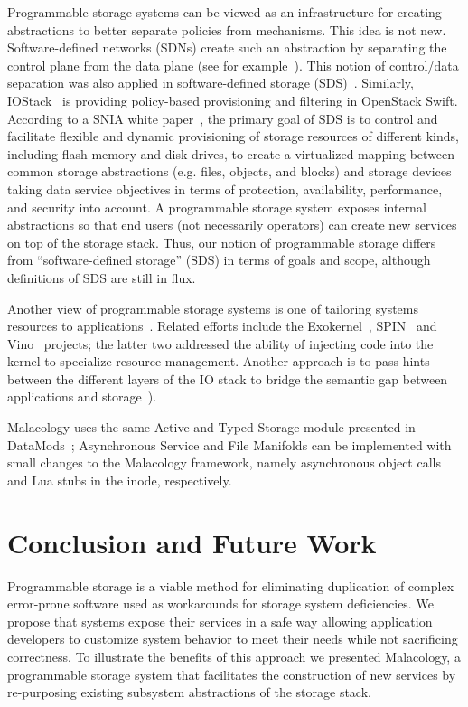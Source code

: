\documentclass[preprint]{sigplanconf-eurosys}
\begin{document}
Programmable storage systems can be viewed as an infrastructure for creating
abstractions to better separate policies from mechanisms. This idea is not new.
Software-defined networks (SDNs) create such an abstraction by separating the
control plane from the data plane (see for example~\cite{jain:sigcomm13}). This
notion of control/data separation was also applied in software-defined storage
(SDS)~\cite{thereska:sosp13,stefanovici:fast16}. Similarly,
IOStack~\cite{gracia:internet16} is providing policy-based provisioning and
filtering in OpenStack Swift. According to a SNIA white
paper~\cite{carlson:snia2014}, the primary goal of SDS is to control and
facilitate flexible and dynamic provisioning of storage resources of different
kinds, including flash memory and disk drives, to create a virtualized mapping
between common storage abstractions (e.g. files, objects, and blocks) and
storage devices taking data service objectives in terms of protection,
availability, performance, and security into account. A programmable storage
system exposes internal abstractions so that end users (not necessarily
operators) can create new services on top of the storage stack. Thus, our
notion of programmable storage differs from ``software-defined storage'' (SDS)
in terms of goals and scope, although definitions of SDS are still in flux.

Another view of programmable storage systems is one of tailoring systems
resources to applications~\cite{arpaci:sosp01}. Related efforts include the
Exokernel~\cite{engler:sosp95}, SPIN~\cite{bershad:sosp95} and
Vino~\cite{seltzer:osdi96} projects; the latter two addressed the ability of injecting
code into the kernel to specialize resource management. Another approach is to
pass hints between the different layers of the IO stack to bridge the semantic
gap between applications and
storage~\cite{arpaci:sosp01,sivathanu:fast03,mesnier:sosp11}).

Malacology uses the same Active and Typed Storage module presented in
DataMods~\cite{watkins_datamods_2012}; Asynchronous Service and File Manifolds
can be implemented with small changes to the Malacology framework, namely
asynchronous object calls and Lua stubs in the inode, respectively.

\section{Conclusion and Future Work}
\label{conclusion-and-future-work}

Programmable storage is a viable method for eliminating duplication of complex
error-prone software used as workarounds for storage system
deficiencies. We propose that systems expose their services in a safe way
allowing application developers to customize system behavior to meet their
needs while not sacrificing correctness. To illustrate the benefits of this
approach we presented Malacology, a programmable storage system that
facilitates the construction of new services by re-purposing existing subsystem
abstractions of the storage stack.
\end{document}
